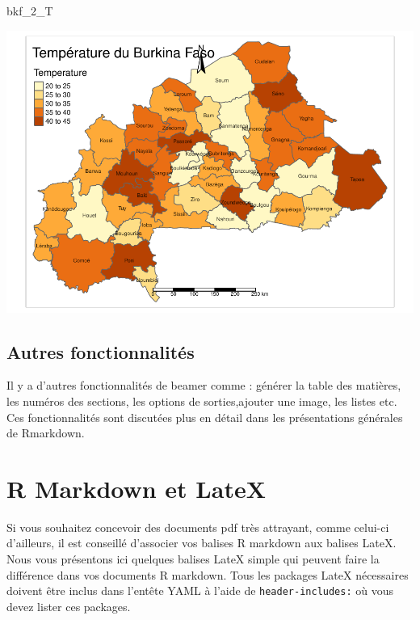 \documentclass[
  12pt,
]{article}
\newenvironment{Shaded}{\begin{snugshade}}{\end{snugshade}}
\newcommand{\NormalTok}[1]{#1}
\begin{document}
\begin{Shaded}
\begin{Highlighting}[]
\NormalTok{bkf\_2\_T}
\end{Highlighting}
\end{Shaded}

\includegraphics{Document_RMD_GRP_files/figure-latex/plot-1.pdf}

\subsection{Autres fonctionnalités}\label{autres-fonctionnalituxe9s}

Il y a d'autres fonctionnalités de beamer comme : générer la table des
matières, les numéros des sections, les options de sorties,ajouter une
image, les listes etc. Ces fonctionnalités sont discutées plus en détail
dans les présentations générales de Rmarkdown.

\newpage

\section{R Markdown et LateX}\label{r-markdown-et-latex}

Si vous souhaitez concevoir des documents pdf très attrayant, comme
celui-ci d'ailleurs, il est conseillé d'associer vos balises R markdown
aux balises LateX. Nous vous présentons ici quelques balises LateX
simple qui peuvent faire la différence dans vos documents R markdown.
Tous les packages LateX nécessaires doivent être inclus dans l'entête
YAML à l'aide de \texttt{header-includes:} où vous devez lister ces
packages.
\end{document}
